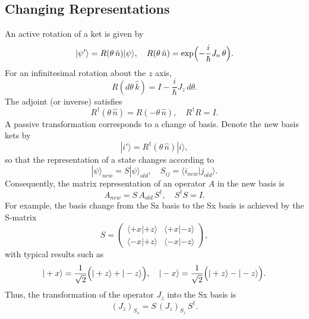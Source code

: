\documentclass[twocolumn]{article}
\begin{document}
\begin{spacing}{1}
  \subsection{Changing Representations}
  An active rotation of a ket is given by
  \[
  |\psi'\rangle = R(\theta\,\hat{n})|\psi\rangle,\quad R(\theta\,\hat{n})=\exp\Bigl(-\frac{i}{\hbar}J_n\,\theta\Bigr).
  \]
  For an infinitesimal rotation about the \(z\) axis,
  \[
  R(d\theta\,\hat{k}) = I -\frac{i}{\hbar}J_z\,d\theta.
  \]
  The adjoint (or inverse) satisfies
  \[
  R^{\dagger}(\theta\,\hat{n})=R(-\theta\,\hat{n}),\quad R^{\dagger}R=I.
  \]
  A passive transformation corresponds to a change of basis. Denote the new basis kets by
  \[
  |i'\rangle = R^{\dagger}(\theta\,\hat{n})|i\rangle,
  \]
  so that the representation of a state changes according to
  \[
  |\psi\rangle_{new} = S|\psi\rangle_{old},\quad S_{ij}=\langle i_{new}|j_{old}\rangle.
  \]
  Consequently, the matrix representation of an operator \(A\) in the new basis is
  \[
  A_{new} = S\,A_{old}\,S^{\dagger},\quad S^{\dagger}S=I.
  \]
  For example, the basis change from the Sz basis to the Sx basis is achieved by the S-matrix
  \[
  S=\begin{pmatrix}\langle +x|+z\rangle & \langle +x|-z\rangle\\[1mm] \langle -x|+z\rangle & \langle -x|-z\rangle\end{pmatrix},
  \]
  with typical results such as
  \[
  |+x\rangle = \frac{1}{\sqrt{2}}\Bigl(|+z\rangle+|-z\rangle\Bigr),\quad
  |-x\rangle = \frac{1}{\sqrt{2}}\Bigl(|+z\rangle-|-z\rangle\Bigr).
  \]
  Thus, the transformation of the operator \(J_z\) into the Sx basis is
  \[
  (J_z)_{S_x}= S\,(J_z)_{S_z}\,S^{\dagger}.
  \]
  

\end{spacing}
\end{document}
